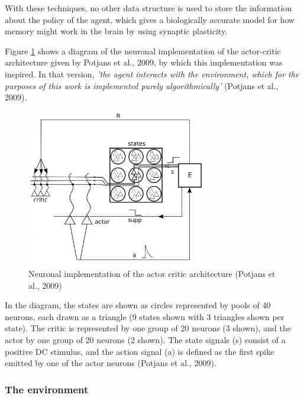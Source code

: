 \documentclass[10pt]{article}
\begin{document}
    \setcounter{figure}{6}

    \newpage
    With these techniques, no other data structure is used to store the information about the policy of the agent, which gives a biologically accurate model for how memory might work in the brain by using synaptic plasticity.

    Figure \ref{fig:potjansImplementation} shows a diagram of the neuronal implementation of the actor-critic architecture given by Potjans et al., 2009, by which this implementation was inspired. In that version, \textit{'the agent interacts with the environment, which for the purposes of this work is implemented purely algorithmically'} (Potjans et al., 2009).

    \begin{figure}[ht!]
    \centering
    \includegraphics[width=80mm]{./implementation.png}
    \caption{Neuronal implementation of the actor critic architecture (Potjans et al., 2009)}
    \label{fig:potjansImplementation}
    \end{figure}

    In the diagram, the states are shown as circles represented by pools of 40 neurons, each drawn as a triangle (9 states shown with 3 triangles shown per state). The critic is represented by one group of 20 neurons (3 shown), and the actor by one group of 20 neurons (2 shown). The state signals (s) consist of a positive DC stimulus, and the action signal (a) is defined as the first spike emitted by one of the actor neurons (Potjans et al., 2009).

    \subsubsection{The environment}
\end{document}
